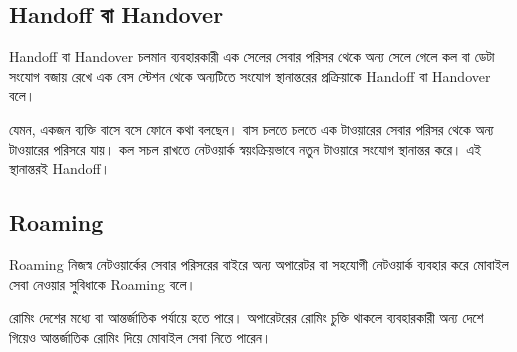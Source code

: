 \subsection{Handoff বা Handover}

\begin{definitionbox}{Handoff বা Handover}
চলমান ব্যবহারকারী এক সেলের সেবার পরিসর থেকে অন্য সেলে গেলে কল বা ডেটা সংযোগ বজায় রেখে এক বেস স্টেশন থেকে অন্যটিতে সংযোগ স্থানান্তরের প্রক্রিয়াকে Handoff বা Handover বলে।
\end{definitionbox}

যেমন, একজন ব্যক্তি বাসে বসে ফোনে কথা বলছেন। বাস চলতে চলতে এক টাওয়ারের সেবার পরিসর থেকে অন্য টাওয়ারের পরিসরে যায়। কল সচল রাখতে নেটওয়ার্ক স্বয়ংক্রিয়ভাবে নতুন টাওয়ারে সংযোগ স্থানান্তর করে। এই স্থানান্তরই Handoff।




\subsection{Roaming}

\begin{definitionbox}{Roaming}
নিজস্ব নেটওয়ার্কের সেবার পরিসরের বাইরে অন্য অপারেটর বা সহযোগী নেটওয়ার্ক ব্যবহার করে মোবাইল সেবা নেওয়ার সুবিধাকে Roaming বলে।
\end{definitionbox}

রোমিং দেশের মধ্যে বা আন্তর্জাতিক পর্যায়ে হতে পারে। অপারেটরের রোমিং চুক্তি থাকলে ব্যবহারকারী অন্য দেশে গিয়েও আন্তর্জাতিক রোমিং দিয়ে মোবাইল সেবা নিতে পারেন।




